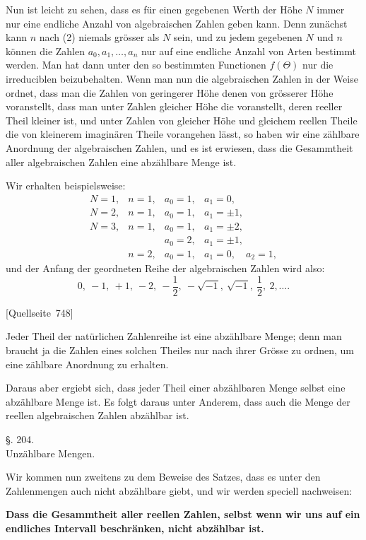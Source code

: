 \documentclass[11pt]{article}
\newcommand{\srcpage}[1]{\par\medskip\noindent\textsf{[Quellseite~#1]}\par\smallskip}
\begin{document}
Nun ist leicht zu sehen, dass es für einen gegebenen Werth der Höhe $N$ immer nur eine endliche Anzahl von algebraischen Zahlen geben kann. Denn zunächst kann $n$ nach (2) niemals grösser als $N$ sein, und zu jedem gegebenen $N$ und $n$ können die Zahlen $a_0,a_1,\ldots,a_n$ nur auf eine endliche Anzahl von Arten bestimmt werden. Man hat dann unter den so bestimmten Functionen $f(\Theta)$ nur die irreduciblen beizubehalten. Wenn man nun die algebraischen Zahlen in der Weise ordnet, dass man die Zahlen von geringerer Höhe denen von grösserer Höhe voranstellt, dass man unter Zahlen gleicher Höhe die voranstellt, deren reeller Theil kleiner ist, und unter Zahlen von gleicher Höhe und gleichem reellen Theile die von kleinerem imaginären Theile vorangehen lässt, so haben wir eine zählbare Anordnung der algebraischen Zahlen, und es ist erwiesen, dass die Gesammtheit aller algebraischen Zahlen eine abzählbare Menge ist.

Wir erhalten beispielsweise:
\[
\begin{array}{llll}
N=1, & n=1, & a_0=1, & a_1=0,\\
N=2, & n=1, & a_0=1, & a_1=\pm1,\\
N=3, & n=1, & a_0=1, & a_1=\pm2,\\
     &      & a_0=2, & a_1=\pm1,\\
     & n=2, & a_0=1, & a_1=0,\quad a_2=1,
\end{array}
\]
und der Anfang der geordneten Reihe der algebraischen Zahlen wird also:
\[
0,\ -1,\ +1,\ -2,\ -\frac12,\ -\sqrt{-1},\ \sqrt{-1},\ \frac12,\ 2,\ldots .
\]

\srcpage{748}
Jeder Theil der natürlichen Zahlenreihe ist eine abzählbare Menge; denn man braucht ja die Zahlen eines solchen Theiles nur nach ihrer Grösse zu ordnen, um eine zählbare Anordnung zu erhalten.

Daraus aber ergiebt sich, dass jeder Theil einer abzählbaren Menge selbst eine abzählbare Menge ist. Es folgt daraus unter Anderem, dass auch die Menge der reellen algebraischen Zahlen abzählbar ist.

\begin{center}
{\large §. 204.}\\[0.4em]
{\large Unzählbare Mengen.}
\end{center}

Wir kommen nun zweitens zu dem Beweise des Satzes, dass es unter den Zahlenmengen auch nicht abzählbare giebt, und wir werden speciell nachweisen:

\begin{center}
\textbf{Dass die Gesammtheit aller reellen Zahlen, selbst wenn wir uns auf ein endliches Intervall beschränken, nicht abzählbar ist.}
\end{center}
\end{document}

